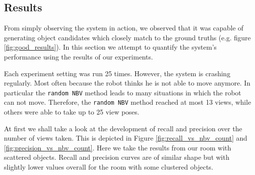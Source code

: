 \documentclass[a4paper,11pt,english]{article}
\begin{document}
\subsection{Results}
From simply observing the system in action, we observed that it was capable of generating object candidates which closely match to the ground truths (e.g. figure \ref{fig:good_results}).
In this section we attempt to quantify the system's performance using the results of our experiments.

Each experiment setting was run 25 times.
However, the system is crashing regularly. Most often because the robot thinks he is not able to move anymore.
In particular the \texttt{random NBV} method leads to many situations in which the robot can not move. Therefore, the \texttt{random NBV} method reached at most 13 views, while others were able to take up to 25 view poses.

At first we shall take a look at the development of recall and precision over the number of views taken.
This is depicted in Figure \ref{fig:recall_vs_nbv_count} and \ref{fig:precision_vs_nbv_count}.
Here we take the results from our room with scattered objects. Recall and precision curves are of similar shape but with slightly lower values overall for the room with some clustered objects.
\end{document}
